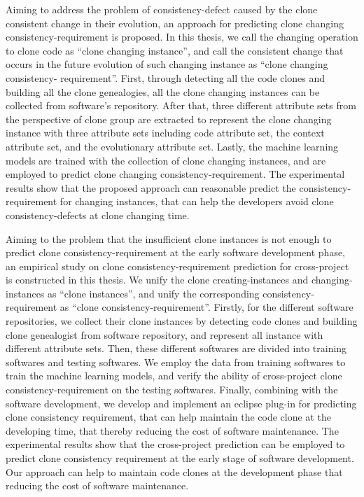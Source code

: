 {Aiming to address the problem of consistency-defect caused by the clone consistent change in their evolution, an approach for predicting clone changing consistency-requirement is proposed. 
In this thesis, we call the changing operation to clone code as ``clone changing instance'', and call the consistent change that occurs in the future evolution of such changing instance as ``clone changing consistency- requirement''.
First, through detecting all the code clones and building all the clone genealogies, all the clone changing instances can be collected  from software's repository.
After that, three different attribute sets from the perspective of clone group are extracted to represent the clone changing instance with three attribute sets including code attribute set, the context attribute set, and the evolutionary attribute set.
Lastly, the machine learning models are trained with the collection of clone changing instances, and are employed to predict clone changing consistency-requirement.
The experimental results show that the proposed approach can reasonable predict the consistency-requirement for changing instances, that can help the developers avoid clone consistency-defects at clone changing time.

Aiming to the problem that the insufficient clone instances is not enough to predict clone consistency-requirement at the early software development phase, an empirical study on clone consistency-requirement prediction for cross-project is constructed in this thesis.
We unify the clone creating-instances and changing-instances as ``clone instances'', and unify the corresponding consistency-requirement as ``clone consistency-requirement''.
Firstly, for the different software repositories, we collect their clone instances by detecting code clones and building clone genealogist from software repository, and represent all instance with different attribute sets.
Then, these different softwares are divided into training softwares and testing softwares. We employ the data from training softwares to train the machine learning models, and verify the ability of cross-project clone consistency-requirement on the testing softwares.
Finally, combining with the software development, we develop and implement an eclipse plug-in for predicting clone consistency requirement, that can help maintain the code clone at the developing time, that thereby reducing the cost of software maintenance.
The experimental results show that the cross-project prediction can be employed to predict clone consistency requirement at the early stage of software development.
Our approach can help to maintain code clones at the development phase that reducing the cost of software maintenance.

}
